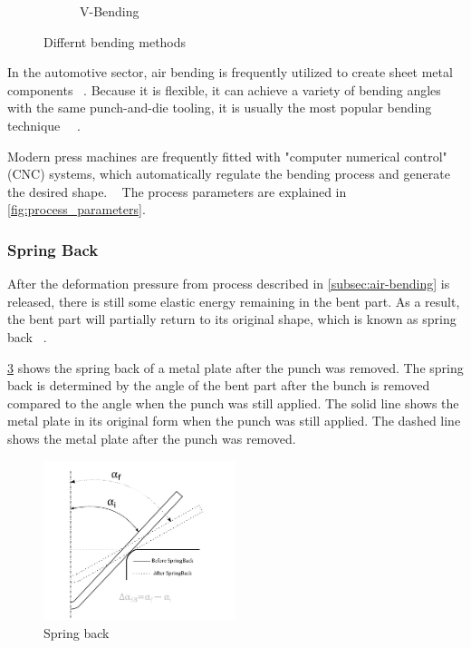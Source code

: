 \begin{figure}[h]
\begin{tcolorbox}[arc=0pt,boxrule=0.5pt, colback=white]
\begin{subfigure}{0.4\textwidth}
            \caption{V-Bending}
            \label{fig:v-bending}
        \end{subfigure}
        \hfill
    \end{tcolorbox}
    \caption{Differnt bending methods~\cite[pp. 416]{groover_fundamentalsmodernmanufacturing_2020}}
    \label{fig:bending-methods}
\end{figure}

In the automotive sector, air bending is frequently utilized to create sheet metal components
~\cite[p. 342]{kim_predictionbendallowance_2007}.
Because it is flexible, it can achieve a variety of bending angles with the same punch-and-die tooling, it
is usually the most popular bending technique
~\cite[p. 3]{miranda_formingspringbackprediction_2018}~\cite[p. 1]{cruz_applicationmachinelearning_2021}.

Modern press machines are frequently fitted with "computer numerical control" (CNC) systems, which automatically
regulate the bending process and generate the desired shape.
~\cite[p. 3]{miranda_formingspringbackprediction_2018}
The process parameters are explained in \cref{fig:process_parameters}.

\subsubsection{Spring Back}\label{subsubsec:spring-back}
After the deformation pressure from process described in \cref{subsec:air-bending} is released, there is still
some elastic energy remaining in the bent part.
As a result, the bent part will partially return to its original
shape, which is known as spring back
~\cite[p. 413--414]{groover_fundamentalsmodernmanufacturing_2020}.

\cref{fig:spring-back} shows the spring back of a metal plate after the punch was removed.
The spring back is determined by the angle of the bent part after the bunch is removed compared to the angle when
the punch was still applied.
The solid line shows the metal plate in its original form when the punch was still
applied.
The dashed line shows the metal plate after the punch was removed.

\begin{figure}[h]
    \centering
    \includegraphics[width=0.5\textwidth]{chap3/images/spring-back}
    \caption{Spring back~\cite[p. 5]{cruz_applicationmachinelearning_2021}}
    \label{fig:spring-back}
\end{figure}

